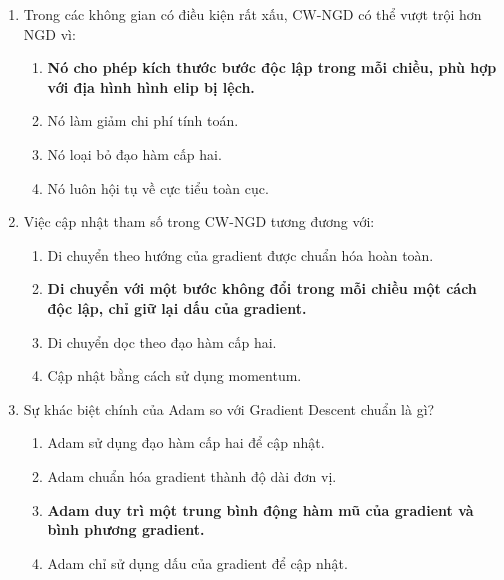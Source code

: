 \documentclass{book}
\begin{document}
\begin{enumerate}
    \item Trong các không gian có điều kiện rất xấu, CW-NGD có thể vượt trội hơn NGD vì:
    \begin{multicols}{2}
        \begin{enumerate}[label=\Alph*]
            \item \textbf{Nó cho phép kích thước bước độc lập trong mỗi chiều, phù hợp với địa hình hình elip bị lệch.}
            \item Nó làm giảm chi phí tính toán.
            \item Nó loại bỏ đạo hàm cấp hai.
            \item Nó luôn hội tụ về cực tiểu toàn cục.
        \end{enumerate}
    \end{multicols}

    \item Việc cập nhật tham số trong CW-NGD tương đương với:
    \begin{multicols}{2}
        \begin{enumerate}[label=\Alph*]
            \item Di chuyển theo hướng của gradient được chuẩn hóa hoàn toàn.
            \item \textbf{Di chuyển với một bước không đổi trong mỗi chiều một cách độc lập, chỉ giữ lại dấu của gradient.}
            \item Di chuyển dọc theo đạo hàm cấp hai.
            \item Cập nhật bằng cách sử dụng momentum.
        \end{enumerate}
    \end{multicols}

    \item Sự khác biệt chính của Adam so với Gradient Descent chuẩn là gì?
    \begin{multicols}{2}
        \begin{enumerate}[label=\Alph*]
            \item Adam sử dụng đạo hàm cấp hai để cập nhật.
            \item Adam chuẩn hóa gradient thành độ dài đơn vị.
            \item \textbf{Adam duy trì một trung bình động hàm mũ của gradient và bình phương gradient.}
            \item Adam chỉ sử dụng dấu của gradient để cập nhật.
        \end{enumerate}
    \end{multicols}


\end{enumerate}
\end{document}

